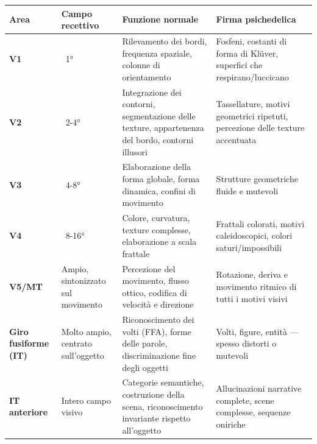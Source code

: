 \documentclass[11pt, twoside, openright]{book}
\begin{document}
\small
\begin{xltabular}{\linewidth}{X X X X}
\toprule
\textbf{Area} & \textbf{Campo recettivo} & \textbf{Funzione normale} & \textbf{Firma psichedelica} \\
\midrule\endhead
\textbf{V1} & ~1° & Rilevamento dei bordi, frequenza spaziale, colonne di orientamento & Fosfeni, costanti di forma di Klüver, superfici che respirano/\allowbreak{}luccicano \\[4pt]
\textbf{V2} & ~2-4° & Integrazione dei contorni, segmentazione delle texture, appartenenza del bordo, contorni illusori & Tassellature, motivi geometrici ripetuti, percezione delle texture accentuata \\[4pt]
\textbf{V3} & ~4-8° & Elaborazione della forma globale, forma dinamica, confini di movimento & Strutture geometriche fluide e mutevoli \\[4pt]
\textbf{V4} & ~8-16° & Colore, curvatura, texture complesse, elaborazione a scala frattale & Frattali colorati, motivi caleidoscopici, colori saturi/\allowbreak{}impossibili \\[4pt]
\textbf{V5/\allowbreak{}MT} & Ampio, sintonizzato sul movimento & Percezione del movimento, flusso ottico, codifica di velocità e direzione & Rotazione, deriva e movimento ritmico di tutti i motivi visivi \\[4pt]
\textbf{Giro fusiforme (IT)} & Molto ampio, centrato sull'oggetto & Riconoscimento dei volti (FFA), forme delle parole, discriminazione fine degli oggetti & Volti, figure, entità --- spesso distorti o mutevoli \\[4pt]
\textbf{IT anteriore} & Intero campo visivo & Categorie semantiche, costruzione della scena, riconoscimento invariante rispetto all'oggetto & Allucinazioni narrative complete, scene complesse, sequenze oniriche \\[4pt]
\bottomrule
\end{xltabular}
\normalsize
\end{document}
